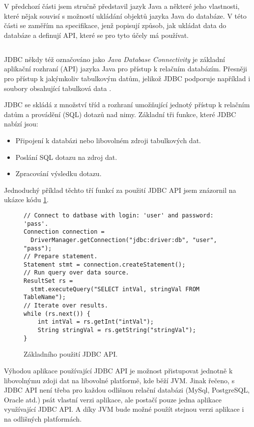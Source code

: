 V předchozí části jsem stručně představil jazyk Java a některé jeho vlastnosti, které nějak souvisí s možností ukládání objektů jazyka Java do databáze. V této části se zaměřím na specifikace, jenž popisují způsob, jak ukládat data do databáze a definují API, které se pro tyto účely má používat. 

\subsection{\jdbc}
JDBC někdy též označováno jako \textit{Java Database Connectivity} je základní aplikační rozhraní (API) jazyka Java pro přístup k relačním databázím. Přesněji pro přístup k jakýmkoliv tabulkovým datům, jelikož JDBC podporuje například i soubory obsahující tabulková data \cite{fisher:jdbc,donahue:jdpb}.

JDBC se skládá z množství tříd a rozhraní umožňující jednotý přístup k relačním datům a provádění (SQL) dotazů nad nimy. Základní tři funkce, které JDBC nabízí jsou:
\begin{itemize}
  \item Připojení k databázi nebo libovolném zdroji tabulkových dat.
  \item Poslání SQL dotazu na zdroj dat.
  \item Zpracování výsledku dotazu.
\end{itemize}

Jednoduchý příklad těchto tří funkcí za použití JDBC API jsem znázornil na ukázce kódu \ref{jdbc:conn}.
\begin{figure}
\begin{lstlisting}
// Connect to datbase with login: 'user' and password: 'pass'.
Connection connection = 
  DriverManager.getConnection("jdbc:driver:db", "user", "pass");
// Prepare statement.
Statement stmt = connection.createStatement();
// Run query over data source.
ResultSet rs = 
  stmt.executeQuery("SELECT intVal, stringVal FROM TableName");
// Iterate over results.
while (rs.next()) {
    int intVal = rs.getInt("intVal");
    String stringVal = rs.getString("stringVal");
}
\end{lstlisting}
\caption{Základního použití JDBC API.}
\label{jdbc:conn}
\end{figure}


Výhodou aplikace používající JDBC API je možnost přistupovat jednotně k libovolnýmu zdoji dat na libovolné platformě, kde běží JVM. Jinak řečeno, s JDBC API není třeba pro každou odlišnou relační databázi (MySql, PostgreSQL, Oracle atd.) psát vlastní verzi aplikace, ale postačí pouze jedna aplikace využívající JDBC API. A díky JVM bude možné použít stejnou verzi aplikace i na odlišných platformách.

